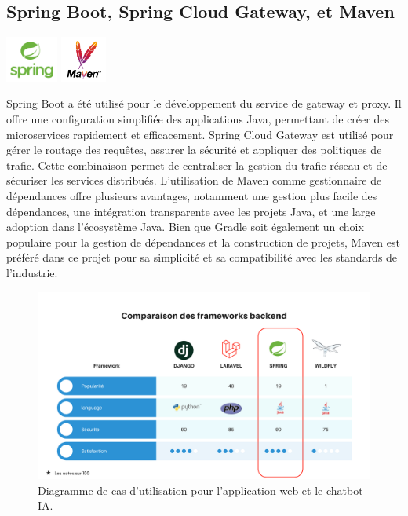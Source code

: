 \documentclass[a4paper, 11pt, openany]{report}
\begin{document}
\subsection{Spring Boot, Spring Cloud Gateway, et Maven}
\begin{center}
\includegraphics[height=1.5cm]{images/spring.png}
\includegraphics[height=1.5cm]{maven.png}
\end{center}

Spring Boot a été utilisé pour le développement du service de gateway et proxy. Il offre une configuration simplifiée des applications Java, permettant de créer des microservices rapidement et efficacement. Spring Cloud Gateway est utilisé pour gérer le routage des requêtes, assurer la sécurité et appliquer des politiques de trafic. Cette combinaison permet de centraliser la gestion du trafic réseau et de sécuriser les services distribués. L'utilisation de Maven comme gestionnaire de dépendances offre plusieurs avantages, notamment une gestion plus facile des dépendances, une intégration transparente avec les projets Java, et une large adoption dans l'écosystème Java. Bien que Gradle soit également un choix populaire pour la gestion de dépendances et la construction de projets, Maven est préféré dans ce projet pour sa simplicité et sa compatibilité avec les standards de l'industrie.



\begin{figure}[h!]
\centering
\includegraphics[width=\textwidth]{images/bechmark.png}
\caption{Diagramme de cas d'utilisation pour l'application web et le chatbot IA.}
\label{fig:bechmark}
\end{figure}
\end{document}

